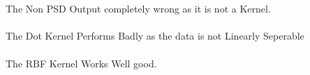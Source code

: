 \begin{answer}
\\ \\
The Non PSD Output completely wrong as it is not a Kernel. \\ \\
The Dot Kernel Performs Badly as the data is not Linearly Seperable \\ \\
The RBF Kernel Works Well good. \\ \\
\end{answer}
